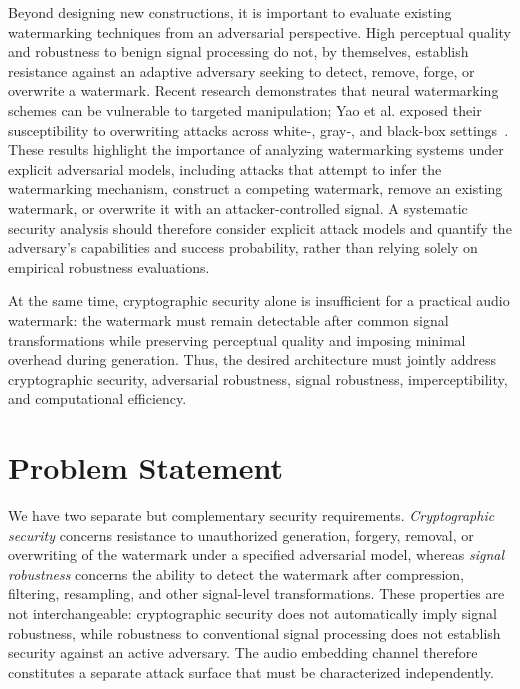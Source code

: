 Beyond designing new constructions, it is important to evaluate existing watermarking techniques from an adversarial perspective.
High perceptual quality and robustness to benign signal processing do not, by themselves, establish resistance against an adaptive adversary seeking to detect, remove, forge, or overwrite a watermark.
Recent research demonstrates that neural watermarking schemes can be vulnerable to targeted manipulation; Yao et al. exposed their susceptibility to overwriting attacks across white-, gray-, and black-box settings~\cite{Yao2026Yours}.
These results highlight the importance of analyzing watermarking systems under explicit adversarial models, including attacks that attempt to infer the watermarking mechanism, construct a competing watermark, remove an existing watermark, or overwrite it with an attacker-controlled signal.
A systematic security analysis should therefore consider explicit attack models and quantify the adversary's capabilities and success probability, rather than relying solely on empirical robustness evaluations.

At the same time, cryptographic security alone is insufficient for a practical audio watermark: the watermark must remain detectable after common signal transformations while preserving perceptual quality and imposing minimal overhead during generation.
Thus, the desired architecture must jointly address cryptographic security, adversarial robustness, signal robustness, imperceptibility, and computational efficiency.

\section{Problem Statement}

We have two separate but complementary security requirements.
\emph{Cryptographic security} concerns resistance to unauthorized generation, forgery, removal, or overwriting of the watermark under a specified adversarial model, whereas \emph{signal robustness} concerns the ability to detect the watermark after compression, filtering, resampling, and other signal-level transformations.
These properties are not interchangeable: cryptographic security does not automatically imply signal robustness, while robustness to conventional signal processing does not establish security against an active adversary.
The audio embedding channel therefore constitutes a separate attack surface that must be characterized independently.

